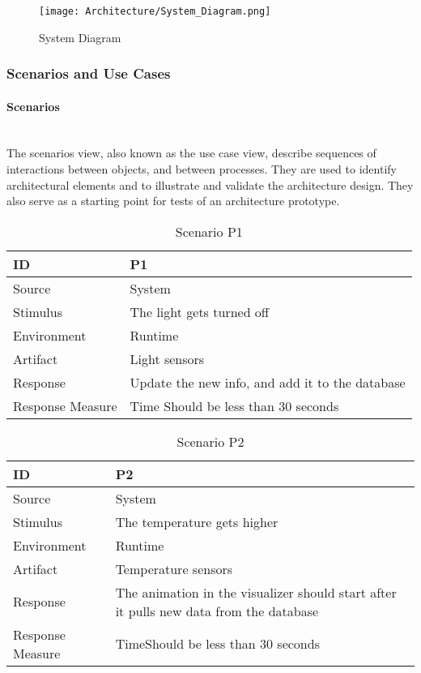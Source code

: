 \documentclass[../document.tex]{subfiles}
\begin{document}
\begin{figure}[H]
	\centering
	\texttt{[image: Architecture/System\_Diagram.png]}
	\caption{System Diagram}
\end{figure}

\subsubsection{Scenarios and Use Cases}
\paragraph{Scenarios} \ \\
The scenarios view, also known as the use case view, describe sequences of interactions between objects, and between processes. They are used to identify architectural elements and to illustrate and validate the architecture design. They also serve as a starting point for tests of an architecture prototype.

\begin{table}[H]
	\caption{Scenario P1}
	\begin{tabularx}{\textwidth}{|X|X|}
		\hline
		ID					& P1 \\ \hline
		Source				& System \\ \hline
		Stimulus			& The light gets turned off \\ \hline
		Environment			& Runtime \\ \hline
		Artifact			& Light sensors \\ \hline
		Response			& Update the new info, and add it to the database \\ \hline
		Response Measure	& Time \newline Should be less than 30 seconds
		\\ \hline
	\end{tabularx}
\end{table}

\begin{table}[H]
	\caption{Scenario P2}
	\begin{tabularx}{\textwidth}{|X|X|}
		\hline
		ID					& P2 \\ \hline
		Source				& System \\ \hline
		Stimulus			& The temperature gets higher \\ \hline
		Environment			& Runtime \\ \hline
		Artifact			& Temperature sensors \\ \hline
		Response			& The animation in the visualizer should start after it pulls new data from the database \\ \hline
		Response Measure	& Time\newline Should be less than 30 seconds
		\\ \hline
	\end{tabularx}
\end{table}
\end{document}
